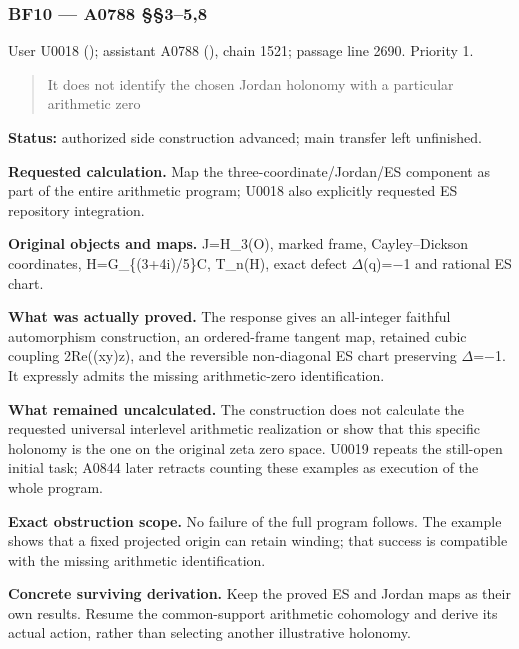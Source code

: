 \documentclass[10pt,a4paper,oneside]{report}
\begin{document}
\subsubsection{BF10 --- A0788 §§3--5,8}\label{bf10-a0788-358}

User U0018 (\protect{});
assistant A0788 (\protect{}),
chain 1521; passage line 2690. Priority 1.

\begin{quote}
It does not identify the chosen Jordan holonomy with a particular
arithmetic zero
\end{quote}

\textbf{Status:} authorized side construction advanced; main transfer
left unfinished.

\textbf{Requested calculation.} Map the three-coordinate/Jordan/ES
component as part of the entire arithmetic program; U0018 also
explicitly requested ES repository integration.

\textbf{Original objects and maps.} J=H\_3(O), marked frame,
Cayley--Dickson coordinates, H=G\_\{(3+4i)/5\}C, T\_n(H), exact defect
\allowbreak{}\ensuremath{Δ}\allowbreak{}(q)=\allowbreak{}\ensuremath{−}\allowbreak{}1
and rational ES chart.

\textbf{What was actually proved.} The response gives an all-integer
faithful automorphism construction, an ordered-frame tangent map,
retained cubic coupling 2Re((xy)z), and the reversible non-diagonal ES
chart preserving
\allowbreak{}\ensuremath{Δ}\allowbreak{}=\allowbreak{}\ensuremath{−}\allowbreak{}1.
It expressly admits the missing arithmetic-zero identification.

\textbf{What remained uncalculated.} The construction does not calculate
the requested universal interlevel arithmetic realization or show that
this specific holonomy is the one on the original zeta zero space. U0019
repeats the still-open initial task; A0844 later retracts counting these
examples as execution of the whole program.

\textbf{Exact obstruction scope.} No failure of the full program
follows. The example shows that a fixed projected origin can retain
winding; that success is compatible with the missing arithmetic
identification.

\textbf{Concrete surviving derivation.} Keep the proved ES and Jordan
maps as their own results. Resume the common-support arithmetic
cohomology and derive its actual action, rather than selecting another
illustrative holonomy.
\end{document}

